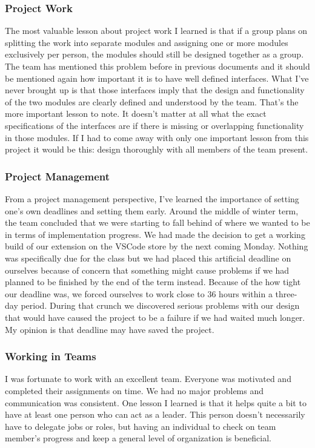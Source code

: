 \documentclass[letterpaper,10pt,titlepage,draftclsnofoot,onecolumn,onesided] {IEEEtran}
\begin{document}
\subsubsection{Project Work}
The most valuable lesson about project work I learned is that if a group plans on splitting the work into separate modules and assigning one or more modules exclusively per person, the modules should still be designed together as a group. 
The team has mentioned this problem before in previous documents and it should be mentioned again how important it is to have well defined interfaces. 
What I've never brought up is that those interfaces imply that the design and functionality of the two modules are clearly defined and understood by the team.
That's the more important lesson to note. 
It doesn't matter at all what the exact specifications of the interfaces are if there is missing or overlapping functionality in those modules. 
If I had to come away with only one important lesson from this project it would be this: design thoroughly with all members of the team present.

\subsubsection{Project Management}
From a project management perspective, I've learned the importance of setting one's own deadlines and setting them early. 
Around the middle of winter term, the team concluded that we were starting to fall behind of where we wanted to be in terms of implementation progress. 
We had made the decision to get a working build of our extension on the VSCode store by the next coming Monday. 
Nothing was specifically due for the class but we had placed this artificial deadline on ourselves because of concern that something might cause problems if we had planned to be finished by the end of the term instead. 
Because of the how tight our deadline was, we forced ourselves to work close to 36 hours within a three-day period. 
During that crunch we discovered serious problems with our design that would have caused the project to be a failure if we had waited much longer.
My opinion is that deadline may have saved the project.

\subsubsection{Working in Teams}
I was fortunate to work with an excellent team. 
Everyone was motivated and completed their assignments on time. 
We had no major problems and communication was consistent. 
One lesson I learned is that it helps quite a bit to have at least one person who can act as a leader. 
This person doesn't necessarily have to delegate jobs or roles, but having an individual to check on team member's progress and keep a general level of organization is beneficial. 
\end{document}
